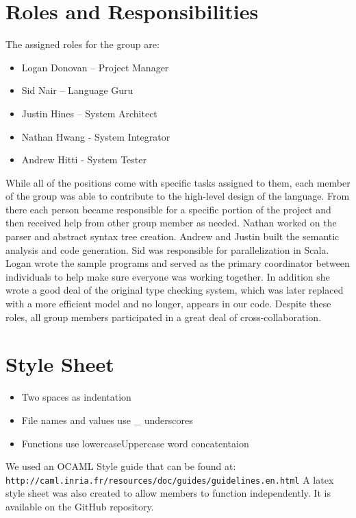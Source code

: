 \section{Roles and Responsibilities}
The assigned roles for the group are:
\begin{itemize}
\item Logan Donovan – Project Manager
\item Sid Nair – Language Guru
\item Justin Hines – System Architect
\item Nathan Hwang - System Integrator
\item Andrew Hitti	- System Tester
\end{itemize}

While all of the positions come with specific tasks assigned to them,
each member of the group was able to contribute to the high-level
design of the language.  From there each person became responsible for
a specific portion of the project and then received help from other
group member as needed. Nathan worked on the parser and abstract
syntax tree creation. Andrew and Justin built the semantic analysis
and code generation. Sid was responsible for parallelization in
Scala. Logan wrote the sample programs and served as the primary
coordinator between individuals to help make sure everyone was working
together. In addition she wrote a good deal of the original type
checking system, which was later replaced with a more efficient model
and no longer, appears in our code. Despite these roles, all group
members participated in a great deal of cross-collaboration.

\section{Style Sheet}
\begin{itemize}
\item Two spaces as indentation 
\item File names and values use \_ underscores
\item Functions use lowercaseUppercase word concatentaion 
\end{itemize}

We used an OCAML Style guide that can be found at:
\\ \verb=http://caml.inria.fr/resources/doc/guides/guidelines.en.html=
\newline
A latex style sheet was also created to allow members to function independently. It is available on the GitHub repository.
